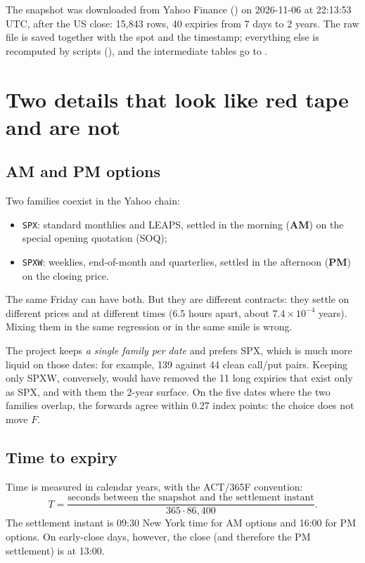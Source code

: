 \begin{progetto}
The snapshot was downloaded from Yahoo Finance () on \mbox{2026-11-06} at 22:13:53 UTC,
after the US close: 15{,}843 rows, 40 expiries from 7 days to 2 years. The raw file is saved together with the spot
and the timestamp; everything else is recomputed by scripts (), and the intermediate
tables go to .
\end{progetto}

\section{Two details that look like red tape and are not}
\subsection{AM and PM options}
Two families coexist in the Yahoo chain:
\begin{itemize}
\item \texttt{SPX}: standard monthlies and LEAPS, settled in the morning (\textbf{AM}) on the special opening quotation
(SOQ);
\item \texttt{SPXW}: weeklies, end-of-month and quarterlies, settled in the afternoon (\textbf{PM}) on the closing
price.
\end{itemize}
The same Friday can have both. But they are different contracts: they settle on different prices and at different
times (6.5 hours apart, about ${7.4\times10^{-4}}$ years). Mixing them in the same regression or in the same smile is
wrong.

The project keeps \emph{a single family per date} and prefers SPX, which is much more liquid on those dates: for
example, 139 against 44 clean call/put pairs. Keeping only SPXW, conversely, would have removed the 11 long expiries
that exist only as SPX, and with them the 2-year surface. On the five dates where the two families overlap, the
forwards agree within 0.27 index points: the choice does not move $F$.

\subsection{Time to expiry}
Time is measured in calendar years, with the ACT/365F convention:
\begin{equation}\label{eq:tempo-act365}
T=\frac{\text{seconds between the snapshot and the settlement instant}}{365\cdot86{,}400}.
\end{equation}
The settlement instant is 09:30 New York time for AM options and 16:00 for PM options. On early-close days, however,
the close (and therefore the PM settlement) is at 13:00.

